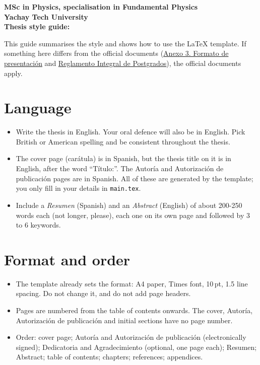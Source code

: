 \documentclass[a4paper,10pt,openany]{thesis}
\begin{document}
\begin{center}
    {\Large\bfseries MSc in Physics, specialisation in Fundamental Physics\\
    Yachay Tech University\\[5pt]
    Thesis style guide:}\\[2pt]
    
\end{center}

This guide summarises the style and shows how to use the \LaTeX{} template. If something here differs from the official documents (\href{https://yachaytecheduec-my.sharepoint.com/:w:/r/personal/posgrados_yachaytech_edu_ec/Documents/4.5.2\%20POSGRADOS/FORMATOS/Estudiantes/Formatos\%20para\%20titulaci\%C3\%B3n/Anexo\%203.\%20Formato\%20de\%20presentaci\%C3\%B3n.docx?d=w914bf4407dba4fd4ab353bf88fc8fdef&csf=1&web=1&e=EQSmdg}{Anexo 3. Formato de presentación} and \href{https://www.yachaytech.edu.ec/wp-content/uploads/2021/11/RCIFI-S0-011-No.-0320-2021-Reglamento-integral-de-postgrados.pdf}{Reglamento Integral de Postgrados}), the official documents apply.

\section{Language}
\begin{itemize}
     \item Write the thesis in English. Your oral defence will also be in English. Pick British or American spelling and be consistent throughout the thesis.
    \item The cover page (carátula) is in Spanish, but the thesis title on it is in English, after the word ``Título:''. The Autoría and Autorización de publicación pages are in Spanish. All of these are generated by the template; you only fill in your details in \texttt{main.tex}.
    \item Include a \textit{Resumen} (Spanish) and an \textit{Abstract} (English) of about 200-250 words each (not longer, please), each one on its own page and followed by 3 to 6 keywords.
\end{itemize}

\section{Format and order}
\begin{itemize}
    \item The template already sets the format: A4 paper, Times font, 10\,pt, 1.5 line spacing. Do not change it, and do not add page headers.
    \item Pages are numbered from the table of contents onwards. The cover, Autoría, Autorización de publicación and initial sections have no page number.
    \item Order: cover page; Autoría and Autorización de publicación (electronically signed); Dedicatoria and Agradecimiento (optional, one page each); Resumen; Abstract; table of contents; chapters; references; appendices.
\end{itemize}
\end{document}
